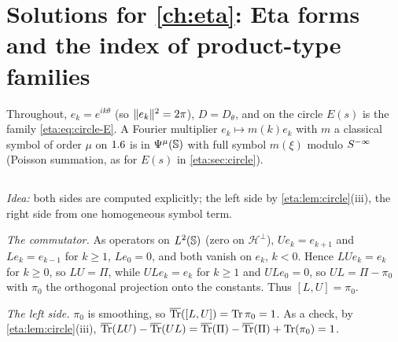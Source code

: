 \providecommand{\Chodd}{\operatorname{Ch}_{\mathrm{odd}}}
\providecommand{\Trbar}{\overline{\operatorname{Tr}}}
\providecommand{\TrR}{\operatorname{Tr}_{\mathrm{R}}}
\providecommand{\wind}{\operatorname{wind}}
\providecommand{\HardyL}{\mathcal{H}}
\providecommand{\GTeta}{G_{\mathcal{T}}}
\providecommand{\PsiT}[1]{\Psi^{#1}_{\mathcal{T}}}

\section{Solutions for \cref{ch:eta}: Eta forms and the index of product-type families}\label{solutions:eta}

Throughout, $e_k=e^{ik\theta}$ (so $\lVert e_k\rVert^2=2\pi$), $D=D_\theta$, and on the
circle $E(s)$ is the family \eqref{eta:eq:circle-E}. A Fourier multiplier
$e_k\mapsto m(k)e_k$ with $m$ a classical symbol of order $\mu$ on $1.6$ is in
$\Psi^{\mu}(\mathbb{S})$ with full symbol $m(\xi)$ modulo $S^{-\infty}$ (Poisson summation, as for $E(s)$
in \cref{eta:sec:circle}).

\subsection*{}

\emph{Idea:} both sides are computed explicitly; the left side by
\cref{eta:lem:circle}(iii), the right side from one homogeneous symbol term.

\emph{The commutator.} As operators on $L^2(\mathbb{S})$ (zero on $\HardyL^\perp$),
$Ue_k=e_{k+1}$ and $Le_k=e_{k-1}$ for $k\ge1$, $Le_0=0$, and both vanish on $e_k$,
$k<0$. Hence $LUe_k=e_k$ for $k\ge0$, so $LU=\Pi$, while $ULe_k=e_k$ for $k\ge1$ and
$ULe_0=0$, so $UL=\Pi-\pi_0$ with $\pi_0$ the orthogonal projection onto the
constants. Thus $[L,U]=\pi_0$.

\emph{The left side.} $\pi_0$ is smoothing, so $\Trbar([L,U])=\Tr\pi_0=1$. As a
check, by \cref{eta:lem:circle}(iii), $\Trbar(LU)-\Trbar(UL)=\Trbar(\Pi)-
\Trbar(\Pi)+\Tr(\pi_0)=1$.

